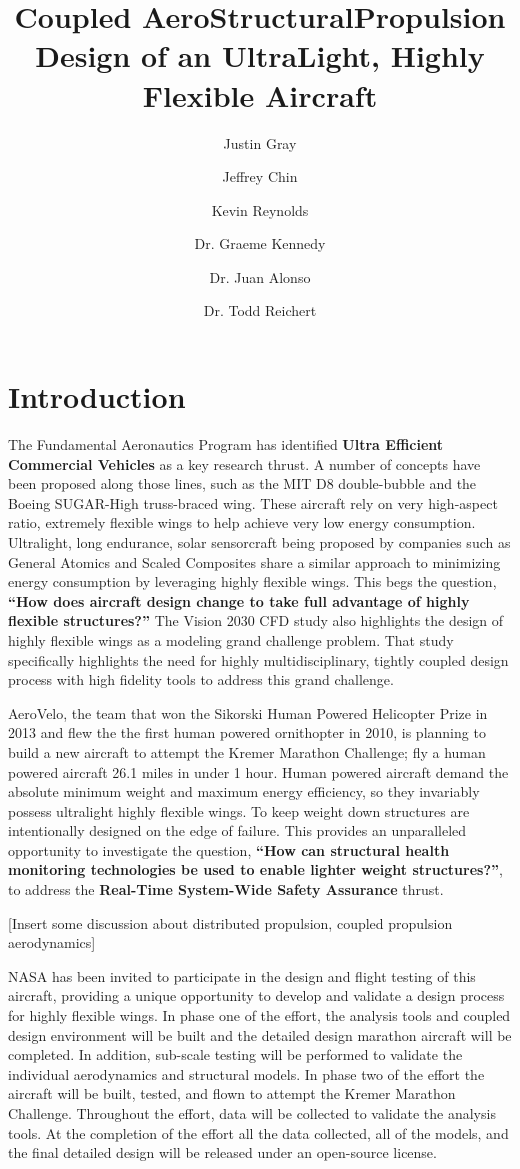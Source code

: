 \documentclass[]{report}
\title{Coupled Aero­Structural­Propulsion Design of an Ultra­Light, Highly Flexible Aircraft}
\author[1]{Justin Gray}
\author[1]{Jeffrey Chin}
\author[2]{Kevin Reynolds}
\author[3]{Dr. Graeme Kennedy}
\author[4]{Dr. Juan Alonso}
\author[4]{Dr. Todd Reichert}
\affil[1]{Aerospace Engineer, NASA Glenn Research Center - LTA Branch}
\affil[2]{Aerospace Engineer, NASA Ames Research Center - TI Branch}
\affil[3]{Assistant Professor, Georgia Institute of Technology, School of Aerospace Engineering}
\affil[4]{Associate Professor, Stanford University, Department of Aeronautics and Astronautics}
\affil[5]{Vice President of Aerodynamics, AeroVelo Inc.}
\begin{document}
  \maketitle

  \section{Introduction}

    The Fundamental Aeronautics Program has identified \textbf{Ultra Efficient Commercial Vehicles} as 
    a key research thrust. A number of concepts have been proposed along those lines, such as 
    the MIT D8 double­-bubble and the Boeing SUGAR­-High truss­-braced wing. These aircraft rely on 
    very high­-aspect ratio, extremely flexible wings to help achieve very low energy consumption. Ultralight, 
    long endurance, solar sensorcraft being proposed by companies such as General Atomics and 
    Scaled Composites share a similar approach to minimizing energy consumption by leveraging highly 
    flexible wings. This begs the question, \textbf{``How does aircraft design change to take full 
    advantage of highly flexible structures?''} The Vision 2030 CFD study also highlights the 
    design of highly flexible wings as a modeling grand challenge problem. That study specifically 
    highlights the need for highly multidisciplinary, tightly coupled design process with high 
    fidelity tools to address this grand challenge.

    Aero­Velo, the team that won the Sikorski Human Powered Helicopter Prize in 2013 and 
    flew the the first human powered ornithopter in 2010, is planning to build a new 
    aircraft to attempt the Kremer Marathon Challenge; fly a human powered aircraft 26.1 
    miles in under 1 hour. Human powered aircraft demand the absolute minimum weight and 
    maximum energy efficiency, so they invariably possess ultralight highly flexible 
    wings. To keep weight down structures are intentionally designed on the edge of 
    failure. This provides an unparalleled opportunity to investigate the question, 
    \textbf{``How can structural health monitoring technologies be used to enable lighter 
    weight structures?''}, to address the \textbf{Real­-Time System­-Wide Safety Assurance} thrust. 

    [Insert some discussion about distributed propulsion, coupled propulsion aerodynamics]

    NASA has been invited to participate in the design and flight testing of this aircraft, providing 
    a unique opportunity to develop and validate a design process for highly flexible wings. 
    In phase one of the effort, the analysis tools and coupled design environment will be built and 
    the detailed design marathon aircraft will be completed. In addition, sub-scale testing will be 
    performed to validate the individual aerodynamics and structural models. In phase two of the effort
    the aircraft will be built, tested, and flown to attempt the Kremer Marathon Challenge. Throughout 
    the effort, data will be collected to validate the analysis tools. At the completion of the effort 
    all the data collected, all of the models, and the final detailed design will be released under 
    an open-source license. 
\end{document}
